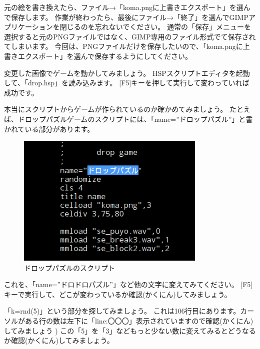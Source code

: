 元の絵を書き換えたら、ファイル→「koma.pngに上書きエクスポート」を選んで保存します。
作業が終わったら、最後にファイル→「終了」を選んでGIMPアプリケーションを閉じるのを忘れないでください。
通常の「保存」メニューを選択すると元のPNGファイルではなく、GIMP専用のファイル形式でて保存されてしまいます。
今回は、PNGファイルだけを保存したいので、「koma.pngに上書きエクスポート」を選んで保存するようにしてください。

変更した画像でゲームを動かしてみましょう。
HSPスクリプトエディタを起動して、「drop.hsp」を読み込みます。
[F5]キーを押して実行して変わっていれば成功です。

本当にスクリプトからゲームが作られているのか確かめてみましょう。
たとえば、ドロップパズルゲームのスクリプトには、「name=”ドロップパズル”」と書かれている部分があります。

\begin{figure}[H]
    \begin{center}
        \includegraphics[keepaspectratio,width=9.049cm,height=6.346cm]{text02-img/text02-img014.png}
        \caption{ドロップパズルのスクリプト}
    \end{center}
\end{figure}

これを、「name=”ドロドロパズル”」など他の文字に変えてみてください。
[F5]キーで実行して、どこが変わっているか確認(かくにん)してみましょう。

「k=rnd(5)」という部分を探してみましょう。
これは106行目にあります。カーソルがある行の数は左下に「line:〇〇〇」表示されていますので確認(かくにん)してみましょう )
この「5」を「3」などもっと少ない数に変えてみるとどうなるか確認(かくにん)してみましょう。

